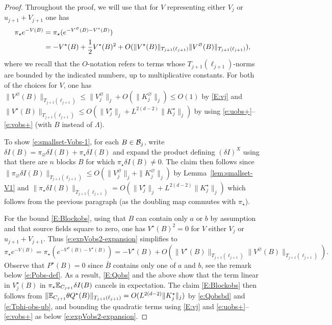\documentclass[11pt]{amsart}
\numberwithin{equation}{section}
\numberwithin{theorem}{section}
\newcommand{\1}{{\bf 1}}
\newcommand{\obs}{\star}
\newcommand{\Vbulk}{V^\varnothing}
\newcommand{\Vobs}{V^\obs}
\newcommand{\Kbulk}{K^\varnothing}
\newcommand{\Kobs}{K^\obs}
\begin{document}
\begin{proof}
  Throughout the proof, we will use that 
  for $V$ representing either $V_j$ or $u_{j+1}+V_{j+1}$ one has
  \begin{align} 
    \pi_\obs e^{-V(B)}
    &= \pi_\obs (e^{-V^\varnothing(B)-V^\obs(B)})\nnb
    &= -V^\obs(B) + \frac12 V^\obs(B)^2 + O(\|V^\obs(B)\|_{T_{j+1}(\ell_{j+1})}\|V^\varnothing(B)\|_{T_{j+1}(\ell_{j+1})}),
      \label{e:expVobs2-expansion}
  \end{align}
  where we recall that the $O$-notation refers to terms whose $T_{j+1}(\ell_{j+1})$-norms are bounded by the indicated numbers, up to multiplicative constants.
  For both of the choices for $V$, one has 
$\|V^\varnothing (B)
  \|_{T_{j+1}(\ell_{j+1})}\leq \|V_j^\varnothing\|_j+O(\|K_j^\varnothing\|_j) \leq O(1)$ by  \eqref{E:vj}
  and $\|V^\obs (B)\|_{T_{j+1}(\ell_{j+1})}\leq O(\|V_j^\obs\|_j+L^{2(d-2)}\|K_j^\obs\|_j)$
  by using \eqref{e:uobs+}--\eqref{e:vobs+} (with $B$ instead of $\Lambda$).
    

  To show \eqref{e:smallset-Vobs-1}, for each $B\in\mathcal B_j$, write
  $\delta I(B) = \pi_{\varnothing}\delta I(B) + \pi_{\obs}\delta I(B)$
  and expand the product defining $(\delta I)^{X}$ 
  using that there are $n$ blocks $B$ for which $\pi_\obs \delta I(B)\neq 0$.
  The claim then follows since 
  $\|\pi_{\varnothing} \delta I(B)\|_{T_{j+1}(\ell_{j+1})} \leq O(\|\Vbulk_j\|_j + \|\Kbulk_j\|_j)$
  by Lemma~\ref{lem:smallset-V1} and
  $\|\pi_{\obs}\delta I(B)\|_{T_{j+1}(\ell_{j+1})}=O(\|\Vobs_{j}\|_{j}+L^{2(d-2)}\|\Kobs_{j}\|_{j})$
  which follows from the previous paragraph (as the doubling
    map commutes with $\pi_{\obs}$).

  For the bound \eqref{E:Blockobs}, using that $B$ can contain only
  $a$ or $b$ by assumption and that source fields square to zero, 
  one has $V^\obs(B)^2=0$  for $V$ either $V_j$ or $u_{j+1}+V_{j+1}$.
  Thus \eqref{e:expVobs2-expansion} simplifies to
  \begin{equation} \label{e:expVobs-expansion}
    \pi_\obs e^{-V(B)} = \pi_\obs (e^{-V^\varnothing(B)-V^\obs(B)})
    = -V^\obs(B) + O(\|V^\obs(B)\|_{T_{j+1}(\ell_{j+1})}\|V^\varnothing(B)\|_{T_{j+1}(\ell_{j+1})}).
  \end{equation}
  Observe that $P^\obs(B)=0$ since $\bar B$ contains only one of $a$
  and $b$, see the remark below \eqref{e:Pobs-def}. As a result,
  \eqref{E:Qobs} and 
  the above show that the term linear in $V_j^\obs(B)$ in $\pi_\obs \E_{C_{j+1}}\delta I(B)$ cancels
  in expectation. The claim \eqref{E:Blockobs} then follows from
  $\|\E_{C_{j+1}}\theta Q^\obs(B)\|_{T_{j+1}(\ell_{j+1})}=O(L^{2(d-2)}\|K_j^\obs\|_j)$
  by \eqref{e:Qobsbd} and \eqref{e:Tphi-obs-ub},
  and bounding the quadratic terms using \eqref{E:vj} and
  \eqref{e:uobs+}--\eqref{e:vobs+} as  below \eqref{e:expVobs2-expansion}.



\end{proof}
\end{document}
